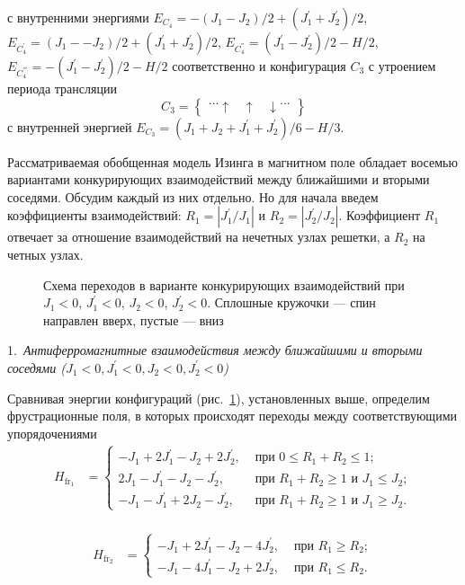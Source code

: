 с внутренними энергиями $E_{C_4} = -(J_1-J_2)/2+(J_{1}^{'}+J_{2}^{'})/2$, $E_{C_4^{'}} = (J_1--J_2)/2+(J_{1}^{'}+J_{2}^{'})/2$, $E_{C_4^{''}} = (J_{1}^{'}-J_{2}^{'})/2-H/2$, $E_{C_4^{'''}} = -(J_{1}^{'}-J_{2}^{'})/2-H/2$ соответственно и конфигурация $C_3$ с утроением периода трансляции
\begin{equation*}
C_3 =
\left\{\!\begin{aligned}
\dots \uparrow\;\;\; \uparrow \;\;\;\downarrow   \dots 
\end{aligned}\right\}
\end{equation*}
с внутренней энергией $E_{C_3} = (J_1+J_2+J_{1}^{'}+J_{2}^{'})/6-H/3$.

Рассматриваемая обобщенная модель Изинга в магнитном поле обладает восемью вариантами конкурирующих взаимодействий между ближайшими и вторыми соседями. Обсудим каждый из них отдельно. Но для начала введем коэффициенты взаимодействий: $R_1 = |J_1^{'} /J_1|$ и $R_2 = |J_2^{'} /J_2|$. Коэффициент $R_1$ отвечает за отношение взаимодействий на нечетных узлах решетки, а $R_2$ на четных узлах.		

 \begin{figure}[h]
 	\caption{Схема переходов в варианте конкурирующих взаимодействий при $J_1 < 0$, $J_1^{'} < 0$, $J_2 < 0$, $J_2^{'} < 0$. Сплошные кружочки --- спин направлен вверх, пустые --- вниз}
 	\label{transGenChain1}
 \end{figure}

1.~\emph{Антиферромагнитные взаимодействия между ближайшими и вторыми соседями ($J_1 < 0, J_1^{'} < 0, J_2 < 0, J_2^{'} < 0$)}

Сравнивая энергии конфигураций (рис.~\ref{transGenChain1}), установленных выше, определим фрустрационные поля, в которых происходят переходы между соответствующими упорядочениями
\[
\begin{aligned}
H_{\text{fr$_1$}}&=
\begin{cases}
-J_1+2J_1^{'}-J_2+2J_2^{'}, & \text{ при }  0\leq R_1+R_2\leq 1; \\
2J_1-J_1^{'}-J_2-J_2^{'},   & \text{ при }  R_1+R_2\ge 1 \text{ и } J_{1}\leq J_{2}; \\
-J_1-J_1^{'}+2J_2-J_2^{'}, & \text{ при }  R_1+R_2\ge 1 \text{ и } J_{1}\ge J_{2}.
\end{cases}\\
\end{aligned}
\]

\[
\begin{aligned}
H_{\text{fr$_2$}}&=
\begin{cases}
-J_1+2J_1^{'}-J_2-4J_2^{'}, & \text{ при }  R_1\ge R_2; \\
-J_1-4J_1^{'}-J_2+2J_2^{'},   & \text{ при }  R_1\leq R_2.
\end{cases}\\
\end{aligned}
\]

